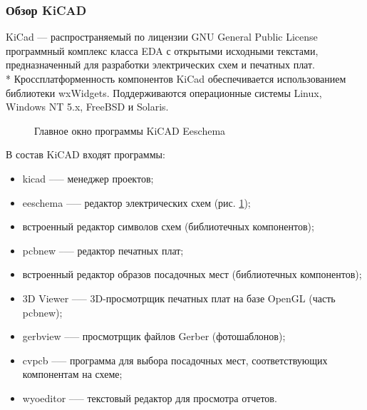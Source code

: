 \subsubsection{Обзор KiCAD}
\begin{par}
KiCad --- распространяемый по лицензии GNU General Public License программный
комплекс класса EDA с открытыми исходными текстами, предназначенный для разработки
электрических схем и печатных плат. \\*
Кроссплатформенность компонентов KiCad обеспечивается использованием библиотеки wxWidgets.
Поддерживаются операционные системы Linux, Windows NT 5.x, FreeBSD и Solaris.
\begin{figure}[ht]
	\caption{Главное окно программы KiCAD Eeschema}
	\label{img:kicad}
\end{figure}
\end{par}

\begin{par}
В состав KiCAD входят программы:
    \begin{itemize}
        \item{}kicad --— менеджер проектов;
        \item{}eeschema —-- редактор электрических схем (рис. \ref{img:kicad});
        \item{}встроенный редактор символов схем (библиотечных компонентов);
        \item{}pcbnew --— редактор печатных плат;
        \item{}встроенный редактор образов посадочных мест (библиотечных компонентов);
        \item{}3D Viewer --— 3D-просмотрщик печатных плат на базе OpenGL (часть pcbnew);
        \item{}gerbview --— просмотрщик файлов Gerber (фотошаблонов);
        \item{}cvpcb --— программа для выбора посадочных мест, соответствующих компонентам на схеме;
        \item{}wyoeditor --— текстовый редактор для просмотра отчетов.
    \end{itemize}
\end{par}


